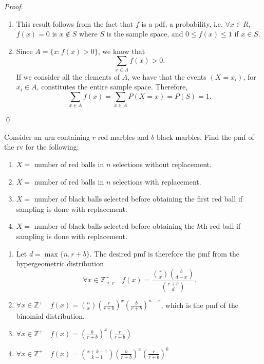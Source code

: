 \documentclass[notoc,notitlepage]{tufte-book}
\begin{document}
\begin{proof}
  \begin{enumerate}
    \item This result follows from the fact that $f$ is a pdf, a probability, i.e. $\forall x \in R$, $f(x) = 0$ is $x \notin S$ where $S$ is the sample space, and $0 \leq f(x) \leq 1$ if $x \in S$.
    \item Since $A = \{x : f(x) > 0\}$, we know that
      \begin{equation*}
         \sum_{x \in A} f(x) > 0.
      \end{equation*}
      If we consider all the elements of $A$, we have that the events $(X = x_i)$, for $x_i \in A$, constitutes the entire sample space. Therefore,
      \begin{equation*}
        \sum_{x \in A} f(x) = \sum_{x \in A} P(X = x) = P(S) = 1.
      \end{equation*}
  \end{enumerate}\qed
\end{proof}

\begin{ex}
  Consider an urn containing $r$ red marbles and $b$ black marbles. Find the pmf of the rv for the following:
  \begin{enumerate}
    \item $X =$ number of red balls in $n$ selections without replacement.
    \item $X =$ number of red balls in $n$ selections with replacement.
    \item $X =$ number of black balls selected before obtaining the first red ball if sampling is done with replacement.
    \item $X =$ number of black balls selected before obtaining the $k$th red ball if sampling is done with replacement.
  \end{enumerate}

  \begin{solution}
    \begin{enumerate}
      \item Let $d = \max\{n, r + b\}$. The desired pmf is therefore the pmf from the hypergeometric distribution
      \begin{equation*}
        \forall x \in \mathbb{Z}_{\leq r}^{+} \quad f(x) = \frac{\binom{r}{x} \binom{b}{d - x}}{\binom{r + b}{d}}.
      \end{equation*}
      \item $\forall x \in \mathbb{Z}^+ \quad f(x) = \binom{n}{x} \left( \frac{r}{r + b} \right)^x \left( \frac{b}{r + b} \right)^{n - x}$, which is the pmf of the binomial distribution.
      \item $\forall x \in \mathbb{Z}^{+} \quad f(x) = \left( \frac{b}{r + b} \right)^x \left( \frac{r}{r + b} \right)$
      \item $\forall x \in \mathbb{Z}^{+} \quad f(x) = \binom{x + k - 1}{k - 1} \left( \frac{b}{r + b} \right)^x \left( \frac{r}{r + b} \right)^k$
    \end{enumerate}
  \end{solution}
\end{ex}
\end{document}
